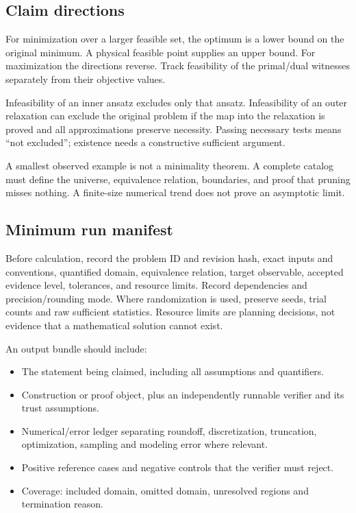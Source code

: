 \documentclass[
  11pt,
]{article}
\providecommand{\tightlist}{%
  \setlength{\itemsep}{0pt}\setlength{\parskip}{0pt}}
\begin{document}
\subsection{Claim directions}

For minimization over a larger feasible set, the optimum is a lower
bound on the original minimum. A physical feasible point supplies an
upper bound. For maximization the directions reverse. Track feasibility
of the primal/dual witnesses separately from their objective values.

Infeasibility of an inner ansatz excludes only that ansatz.
Infeasibility of an outer relaxation can exclude the original problem if
the map into the relaxation is proved and all approximations preserve
necessity. Passing necessary tests means ``not excluded''; existence
needs a constructive sufficient argument.

A smallest observed example is not a minimality theorem. A complete
catalog must define the universe, equivalence relation, boundaries, and
proof that pruning misses nothing. A finite-size numerical trend does
not prove an asymptotic limit.

\subsection{Minimum run manifest}

Before calculation, record the problem ID and revision hash, exact
inputs and conventions, quantified domain, equivalence relation, target
observable, accepted evidence level, tolerances, and resource limits.
Record dependencies and precision/rounding mode. Where randomization is
used, preserve seeds, trial counts and raw sufficient statistics.
Resource limits are planning decisions, not evidence that a mathematical
solution cannot exist.

An output bundle should include:

\begin{itemize}
\tightlist
\item
  The statement being claimed, including all assumptions and
  quantifiers.
\item
  Construction or proof object, plus an independently runnable verifier
  and its trust assumptions.
\item
  Numerical/error ledger separating roundoff, discretization,
  truncation, optimization, sampling and modeling error where relevant.
\item
  Positive reference cases and negative controls that the verifier must
  reject.
\item
  Coverage: included domain, omitted domain, unresolved regions and
  termination reason.
\end{itemize}
\end{document}
